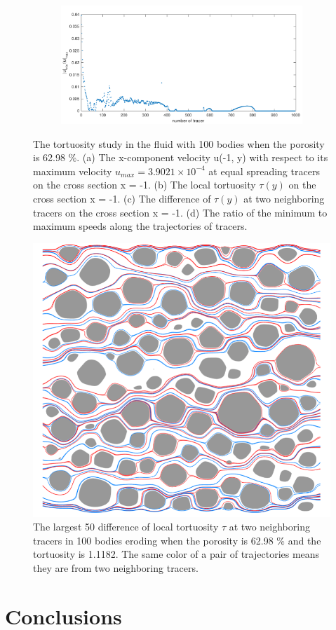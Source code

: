 \documentclass[preprint, 10pt]{elsarticle}
\begin{document}
\begin{figure}[H]
\begin{subfigure}[b]{0.5\textwidth}
\includegraphics*[width =\linewidth]{./figs/uminDumax100}
\caption{}
\end{subfigure}
\caption{\label{fig:Eroding100tort} The tortuosity study in the fluid with 100 bodies 
when the porosity is 62.98 \%.
(a) The 
x-component velocity u(-1, y) with respect to its maximum velocity $u_{max}=3.9021
\times 10^{-4}$ at equal spreading tracers on the cross section x = -1. 
(b) The local tortuosity $\tau(y)$ on the cross section x = -1. 
(c) The difference of $\tau(y)$ at two neighboring tracers on the cross section x = -1.
(d) The ratio of the minimum to maximum speeds along the trajectories of tracers.}
\end{figure}

\begin{figure}[H]
\center
\includegraphics*[width =0.5\linewidth]{./figs/tort100b_diff_top50}
\caption{\label{fig:Eroding100tort_traj} The largest 50 difference of 
local tortuosity $\tau$ at two neighboring tracers in
100 bodies eroding when the porosity is 62.98 \%
and the tortuosity is 1.1182. The same color of a pair of trajectories 
means they are from two neighboring tracers.}
\end{figure}
\section{Conclusions}
\label{s:conclusions}
\end{document}

